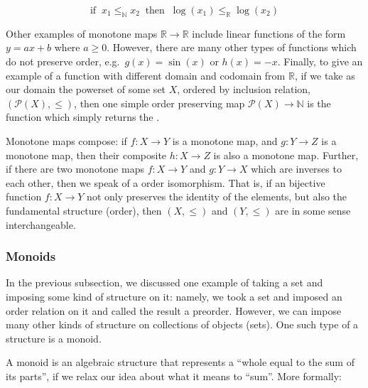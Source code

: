 \documentclass[
  openany]{book}
\theoremstyle{definition}
\theoremstyle{definition}
\theoremstyle{definition}
\theoremstyle{definition}
\theoremstyle{remark}
\begin{document}
\[\text{if} \;\; x_1 \leq_{\mathbb{N}} x_2 \;\; \text{then} \;\; \log(x_1) \leq_{\mathbb{R}} \log(x_2)\]

Other examples of monotone maps \(\mathbb{R} \to \mathbb{R}\) include linear functions of the form \(y = ax + b\) where \(a \geq 0\). However, there are many other types of functions which do not preserve order, e.g.~\(g(x) = \sin(x)\) or \(h(x) = -x\). Finally, to give an example of a function with different domain and codomain from \(\mathbb{R}\), if we take as our domain the powerset of some set \(X\), ordered by inclusion relation, \((\mathcal{P}(X), \leq)\), then one simple order preserving map \(\mathcal{P}(X) \to \mathbb{N}\) is the function which simply returns the .

Monotone maps compose: if \(f: X \to Y\) is a monotone map, and \(g: Y \to Z\) is a monotone map, then their composite \(h: X \to Z\) is also a monotone map. Further, if there are two monotone maps \(f: X \to Y\) and \(g: Y \to X\) which are inverses to each other, then we speak of a order isomorphism. That is, if an bijective function \(f: X \to Y\) not only preserves the identity of the elements, but also the fundamental structure (order), then \((X, \leq)\) and \((Y, \leq)\) are in some sense interchangeable.

\subsubsection{Monoids}\label{monoids-1}

In the previous subsection, we discussed one example of taking a set and imposing some kind of structure on it: namely, we took a set and imposed an order relation on it and called the result a preorder. However, we can impose many other kinds of structure on collections of objects (sets). One such type of a structure is a monoid.

A monoid is an algebraic structure that represents a ``whole equal to the sum of its parts'', if we relax our idea about what it means to ``sum''. More formally:
\end{document}

